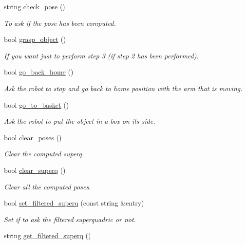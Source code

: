 \begin{DoxyCompactItemize}
string \hyperlink{classGraspDemo_ac731568beb7e7f6fa65e18e1165a5d55}{check\+\_\+pose} ()
\begin{DoxyCompactList}\small\item\em To ask if the pose has been computed. \end{DoxyCompactList}\item 
bool \hyperlink{classGraspDemo_a42dbb269c111baf3d3bfe389e49c315c}{grasp\+\_\+object} ()
\begin{DoxyCompactList}\small\item\em If you want just to perform step 3 (if step 2 has been performed). \end{DoxyCompactList}\item 
bool \hyperlink{classGraspDemo_a594b0cd3274a3117f4c5e636abc3898c}{go\+\_\+back\+\_\+home} ()
\begin{DoxyCompactList}\small\item\em Ask the robot to stop and go back to home position with the arm that is moving. \end{DoxyCompactList}\item 
bool \hyperlink{classGraspDemo_a6a9ed07317e2d0f3fcb39f906dd3d0f0}{go\+\_\+to\+\_\+basket} ()
\begin{DoxyCompactList}\small\item\em Ask the robot to put the object in a box on its side. \end{DoxyCompactList}\item 
bool \hyperlink{classGraspDemo_a26716535b8b8f3914cdb4d59c92de489}{clear\+\_\+poses} ()
\begin{DoxyCompactList}\small\item\em Clear the computed superq. \end{DoxyCompactList}\item 
bool \hyperlink{classGraspDemo_a3299163baab1e29e4f036d4e1c4d0bb6}{clear\+\_\+superq} ()
\begin{DoxyCompactList}\small\item\em Clear all the computed poses. \end{DoxyCompactList}\item 
bool \hyperlink{classGraspDemo_ae7e85fa7ddb934061f32cb14c29a7bf7}{set\+\_\+filtered\+\_\+superq} (const string \&entry)
\begin{DoxyCompactList}\small\item\em Set if to ask the filtered superquadric or not. \end{DoxyCompactList}\item 
string \hyperlink{classGraspDemo_a5b9cc76696c412bb7935a7d26b6f1524}{get\+\_\+filtered\+\_\+superq} ()

\end{DoxyCompactItemize}
